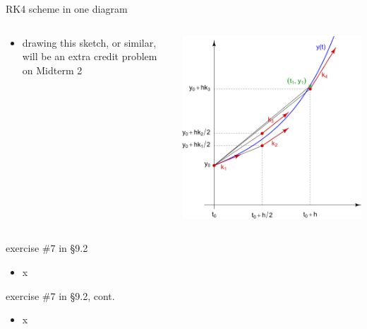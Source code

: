 \documentclass[urlcolor=blue,dvipsnames]{beamer}
\begin{document}
\begin{frame}{RK4 scheme in one diagram}

\begin{columns}
\begin{column}{0.35\textwidth}
\small
\begin{itemize}
\item drawing this sketch, or similar, will be an extra credit problem on Midterm 2
\end{itemize}
\end{column}
\begin{column}{0.65\textwidth}
\hfill \includegraphics[width=\textwidth]{figs/rk4diagram}
\end{column}
\end{columns}
\end{frame}


\begin{frame}{exercise \#7 in \S9.2}

\begin{itemize}
\item x
\end{itemize}
\end{frame}


\begin{frame}{exercise \#7 in \S9.2, cont.}

\begin{itemize}
\item x
\end{itemize}
\end{frame}
\end{document}
